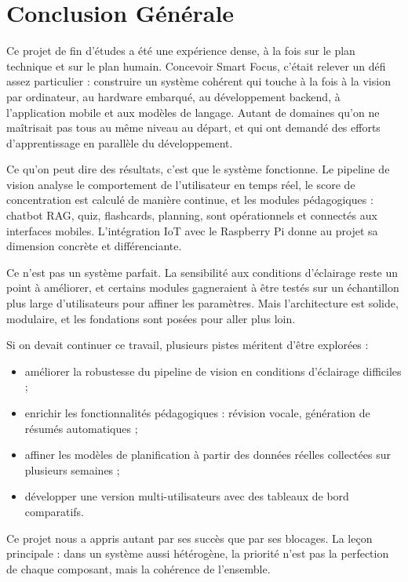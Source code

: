\chapter*{Conclusion Générale}
\label{chap:conclusion}

Ce projet de fin d’études a été une expérience dense, à la fois sur le plan technique et sur le plan humain. Concevoir Smart Focus, c’était relever un défi assez particulier : construire un système cohérent qui touche à la fois à la vision par ordinateur, au hardware embarqué, au développement backend, à l’application mobile et aux modèles de langage. Autant de domaines qu’on ne maîtrisait pas tous au même niveau au départ, et qui ont demandé des efforts d’apprentissage en parallèle du développement.

Ce qu’on peut dire des résultats, c’est que le système fonctionne. Le pipeline de vision analyse le comportement de l’utilisateur en temps réel, le score de concentration est calculé de manière continue, et les modules pédagogiques : chatbot RAG, quiz, flashcards, planning, sont opérationnels et connectés aux interfaces mobiles. L’intégration IoT avec le Raspberry Pi donne au projet sa dimension concrète et différenciante.

Ce n’est pas un système parfait. La sensibilité aux conditions d’éclairage reste un point à améliorer, et certains modules gagneraient à être testés sur un échantillon plus large d’utilisateurs pour affiner les paramètres. Mais l’architecture est solide, modulaire, et les fondations sont posées pour aller plus loin.

Si on devait continuer ce travail, plusieurs pistes méritent d’être explorées :
\begin{itemize}
    \item améliorer la robustesse du pipeline de vision en conditions d’éclairage difficiles ;
    \item enrichir les fonctionnalités pédagogiques : révision vocale, génération de résumés automatiques ;
    \item affiner les modèles de planification à partir des données réelles collectées sur plusieurs semaines ;
    \item développer une version multi-utilisateurs avec des tableaux de bord comparatifs.
\end{itemize}

Ce projet nous a appris autant par ses succès que par ses blocages. La leçon principale : dans un système aussi hétérogène, la priorité n’est pas la perfection de chaque composant, mais la cohérence de l’ensemble.